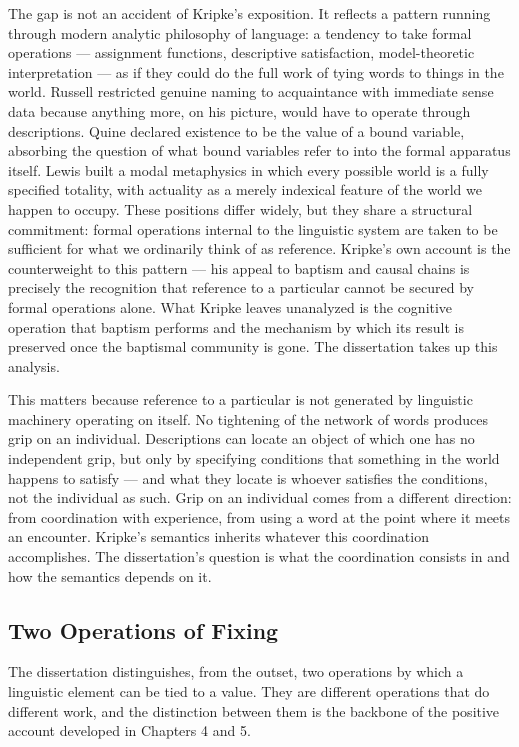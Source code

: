 \documentclass[12pt,a4paper]{article}
\begin{document}
The gap is not an accident of Kripke's exposition. It reflects a pattern running through modern analytic philosophy of language: a tendency to take formal operations --- assignment functions, descriptive satisfaction, model-theoretic interpretation --- as if they could do the full work of tying words to things in the world. Russell restricted genuine naming to acquaintance with immediate sense data because anything more, on his picture, would have to operate through descriptions. Quine declared existence to be the value of a bound variable, absorbing the question of what bound variables refer to into the formal apparatus itself. Lewis built a modal metaphysics in which every possible world is a fully specified totality, with actuality as a merely indexical feature of the world we happen to occupy. These positions differ widely, but they share a structural commitment: formal operations internal to the linguistic system are taken to be sufficient for what we ordinarily think of as reference. Kripke's own account is the counterweight to this pattern --- his appeal to baptism and causal chains is precisely the recognition that reference to a particular cannot be secured by formal operations alone. What Kripke leaves unanalyzed is the cognitive operation that baptism performs and the mechanism by which its result is preserved once the baptismal community is gone. The dissertation takes up this analysis.

This matters because reference to a particular is not generated by linguistic machinery operating on itself. No tightening of the network of words produces grip on an individual. Descriptions can locate an object of which one has no independent grip, but only by specifying conditions that something in the world happens to satisfy --- and what they locate is whoever satisfies the conditions, not the individual as such. Grip on an individual comes from a different direction: from coordination with experience, from using a word at the point where it meets an encounter. Kripke's semantics inherits whatever this coordination accomplishes. The dissertation's question is what the coordination consists in and how the semantics depends on it.

\subsection{Two Operations of Fixing}\label{two-operations-of-fixing}

The dissertation distinguishes, from the outset, two operations by which a linguistic element can be tied to a value. They are different operations that do different work, and the distinction between them is the backbone of the positive account developed in Chapters 4 and 5.
\end{document}
